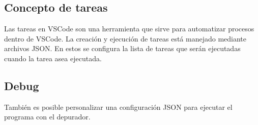 \subsection{Concepto de tareas}

 

Las tareas en VSCode son una herramienta que sirve para automatizar procesos dentro de VSCode. La creación y ejecución de tareas está manejado mediante archivos JSON. En estos se configura la lista de tareas que serán ejecutadas cuando la tarea asea ejecutada.


\subsection{Debug} 
También es posible personalizar una configuración JSON para ejecutar el programa con el depurador.